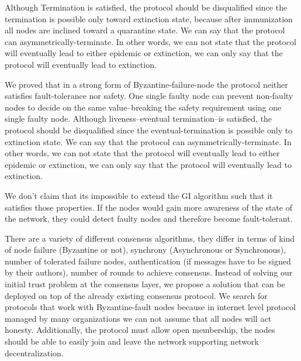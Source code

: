 \documentclass[nostrict]{szablonPG}
\begin{document}
Although Termination is satisfied, the protocol should be disqualified since the termination is possible only toward extinction state, because after immunization all nodes are inclined toward a quarantine state. We can say that the protocol can asymmetrically-terminate. In other words, we can not state that the protocol will eventually lead to either epidemic or extinction, we can only say that the protocol will eventually lead to extinction.

We proved that in a strong form of Byzantine-failure-node the protocol neither satisfies fault-tolerance nor safety. One single faulty node can prevent non-faulty nodes to decide on the same value--breaking the safety requirement using one single faulty node. Although liveness--eventual termination--is satisfied, the protocol should be disqualified since the eventual-termination is possible only to extinction state. We can say that the protocol can asymmetrically-terminate. In other words, we can not state that the protocol will eventually lead to either epidemic or extinction, we can only say that the protocol will eventually lead to extinction.

We don't claim that its impossible to extend the GI algorithm such that it satisfies those properties. If the nodes would gain more awareness of the state of the network, they could detect faulty nodes and therefore become fault-tolerant.

There are a variety of different consensus algorithms, they differ in terms of kind of node failure (Byzantine or not), synchrony (Asynchronous or Synchronous), number of tolerated failure nodes, authentication (if messages have to be signed by their authors), number of rounds to achieve consensus. Instead of solving our initial trust problem at the consensus layer, we propose a solution that can be deployed on top of the already existing consensus protocol. We search for protocols that work with Byzantine-fault nodes because in internet level protocol managed by many organizations we can not assume that all nodes will act honesty. Additionally, the protocol must allow open membership, the nodes should be able to easily join and leave the network supporting network decentralization. 
\end{document}
